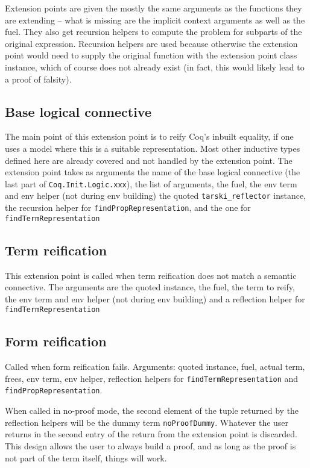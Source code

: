 \documentclass[11pt,a4paper]{article}
\begin{document}
Extension points are given the mostly the same arguments as the functions they are extending -- what is missing are the implicit context arguments as well as the fuel. They also get recursion helpers to compute the problem for subparts of the original expression. Recursion helpers are used because otherwise the extension point would need to supply the original function with the extension point class instance, which of course does not already exist (in fact, this would likely lead to a proof of falsity).
\subsection{Base logical connective}
The main point of this extension point is to reify Coq's inbuilt equality, if one uses a model where this is a suitable representation. Most other inductive types defined here are already covered and not handled by the extension point. The extension point takes as arguments the name of the base logical connective (the last part of \lstinline|Coq.Init.Logic.xxx|), the list of arguments, the fuel, the env term and env helper (not during env building) the quoted \lstinline|tarski_reflector| instance, the recursion helper for \lstinline|findPropRepresentation|, and the one for \lstinline|findTermRepresentation|
\subsection{Term reification}
This extension point is called when term reification does not match a semantic connective. The arguments are the quoted instance, the fuel, the term to reify, the env term and env helper (not during env building) and a reflection helper for \lstinline|findTermRepresentation|
\subsection{Form reification}
Called when form reification fails. Arguments: quoted instance, fuel, actual term, frees, env term, env helper, reflection helpers for \lstinline|findTermRepresentation| and \lstinline|findPropRepresentation|.


When called in no-proof mode, the second element of the tuple returned by the reflection helpers will be the dummy term \lstinline|noProofDummy|. Whatever the user returns in the second entry of the return from the extension point is discarded. This design allows the user to always build a proof, and as long as the proof is not part of the term itself, things will work.
\newpage
\end{document}
